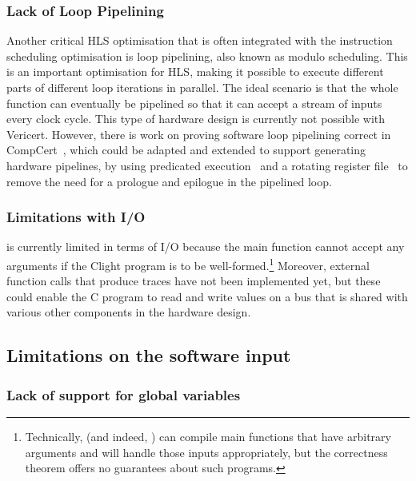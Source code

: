 \subsubsection{Lack of Loop Pipelining}

Another critical \gls{HLS} optimisation that is often integrated with the
instruction scheduling optimisation is loop pipelining, also known as modulo
scheduling.  This is an important optimisation for \gls{HLS}, making it possible
to execute different parts of different loop iterations in parallel.  The ideal
scenario is that the whole function can eventually be pipelined so that it can
accept a stream of inputs every clock cycle.  This type of hardware design is
currently not possible with Vericert.  However, there is work on proving
software loop pipelining correct in
CompCert~\cite{tristan10_simpl_verif_valid_softw_pipel}, which could be adapted
and extended to support generating hardware pipelines, by using predicated
execution~\cite{rau92_code_gener_schem_sched_loops} and a rotating register
file~\cite{rau92_regis_alloc_softw_pipel_loops} to remove the need for a
prologue and epilogue in the pipelined loop.

\subsubsection{Limitations with I/O}

\vericert{} is currently limited in terms of I/O because the main function
cannot accept any arguments if the Clight program is to be
well-formed.\footnote{Technically, \vericert{} (and indeed, \compcert{}) can
  compile main functions that have arbitrary arguments and will handle those
  inputs appropriately, but the correctness theorem offers no guarantees about
  such programs.} Moreover, external function calls that produce traces have not
been implemented yet, but these could enable the C program to read and write
values on a bus that is shared with various other components in the hardware
design.

\subsection{Limitations on the software input}

\subsubsection{Lack of support for global variables}

